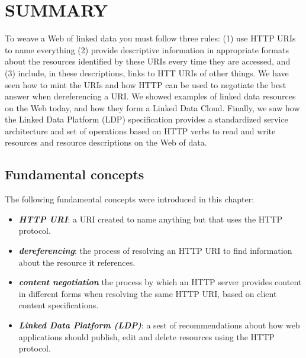 % 




\hypertarget{summary}{%
\section{SUMMARY}\label{summary:ch5}}

To weave a Web of linked data you must follow three rules: (1) use HTTP
URIs to name everything (2) provide descriptive information in
appropriate formats about the resources identified by these URIs every
time they are accessed, and (3) include, in these descriptions, links to
HTT URIs of other things. We have seen how to mint the URIs and how
HTTP can be used to negotiate the best answer when dereferencing a URI.
We showed examples of linked data resources on the Web today, and how they form
a Linked Data Cloud. 
Finally, we saw how
the Linked Data Platform (LDP) specification provides a standardized service
architecture and set of operations based on HTTP verbs to read and write
resources and resource descriptions on the Web of data.

\hypertarget{fundamental-concepts}{%
\subsection{Fundamental concepts}\label{fundamental-concepts}}

The following fundamental concepts were introduced in this chapter:

\begin{itemize}
\item
  \emph{\textbf{HTTP URI}}: a URI created to name anything but that
  uses the HTTP protocol.
\item
  \emph{\textbf{dereferencing}}: the process of resolving an HTTP URI to find information about 
  the resource it references. 
\item
  \emph{\textbf{content negotiation}} the process by which an HTTP server provides content in different forms when 
  resolving the
  same HTTP URI, based on client content specifications.  

\item 
  \emph{\textbf{Linked Data Platform (LDP)}}: a sest of recommendations about how web applications should 
  publish, edit and delete resources using the HTTP protocol.
\end{itemize}

